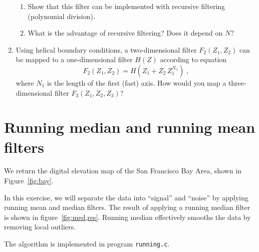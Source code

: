 \begin{enumerate}
\begin{enumerate}
\item Show that this filter can be implemented with recursive filtering (polynomial division).
\item What is the advantage of recursive filtering? Does it depend on $N$?
\end{enumerate}

\item Using helical boundary conditions, a two-dimensional filter $F_2(Z_1,Z_2)$ can be mapped 
to a one-dimensional filter $H(Z)$ according to equation
\begin{equation}
\label{eq:helix}
F_2(Z_1,Z_2) = H\left(Z_1 + Z_2\,Z_1^{N_1}\right)\;,
\end{equation} 
where $N_1$ is the length of the first (fast) axis. How would you map
a three-dimensional filter $F_3(Z_1,Z_2,Z_3)$?

\end{enumerate}

\newpage

\section{Running median and running mean filters}


We return the digital elevation map of the San Francisco Bay Area, shown in Figure~\ref{fig:bay}.

In this exercise, we will separate the data into ``signal'' and
``noise'' by applying running mean and median filters.  The result of
applying a running median filter is shown in
figure~\ref{fig:med,res}. Running median effectively smooths the data
by removing local outliers.



The algorithm is implemented in program \texttt{running.c}.



